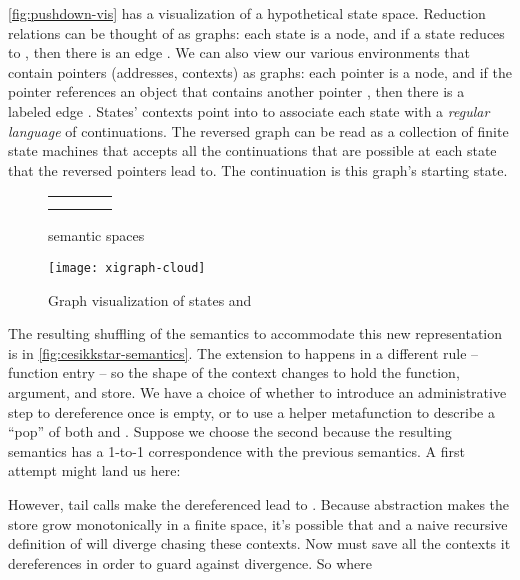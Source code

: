 \autoref{fig:pushdown-vis} has a visualization of a hypothetical state space.
Reduction relations can be thought of as graphs: each state is a node, and if a state  reduces to , then there is an edge .
We can also view our various environments that contain pointers (addresses, contexts) as graphs: each pointer is a node, and if the pointer  references an object  that contains another pointer , then there is a labeled edge .
States' contexts point into  to associate each state with a \emph{regular language} of continuations.
The reversed  graph can be read as a collection of finite state machines that accepts all the continuations that are possible at each state that the reversed pointers lead to.
The  continuation is this graph's starting state.

\begin{figure}
  \centering
  \begin{tabular}{rlrl}
     &\hspace{-3mm}&  &\hspace{-3mm} \\
    & &  &\hspace{-3mm}
  \end{tabular}
  \caption{ semantic spaces}
  \label{fig:pushdown-spaces}
\end{figure}

\begin{figure}
  \centering
  \texttt{[image: xigraph-cloud]}
  \caption{Graph visualization of states and }
  \label{fig:pushdown-vis}
\end{figure}

The resulting shuffling of the semantics to accommodate this new representation is in \autoref{fig:cesikkstar-semantics}.
The extension to  happens in a different rule -- function entry -- so the shape of the context changes to hold the function, argument, and store.
We have a choice of whether to introduce an administrative step to dereference  once  is empty, or to use a helper metafunction to describe a ``pop'' of both  and .
Suppose we choose the second because the resulting semantics has a 1-to-1 correspondence with the previous semantics.
A first attempt might land us here:

However, tail calls make the dereferenced  lead to .
Because abstraction makes the store grow monotonically in a finite space, it's possible that  and a naive recursive definition of  will diverge chasing these contexts.
Now  must save all the contexts it dereferences in order to guard against divergence.
So  where


